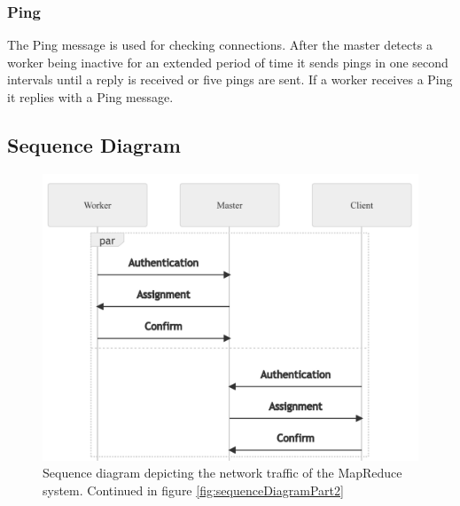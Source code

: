 \documentclass[12pt, letterpaper]{article}
\begin{document}
\subsubsection{Ping}
The Ping message is used for checking connections. After the master detects a worker being inactive for an extended period of time it sends pings in one second intervals until a reply is received or five pings are sent. If a worker receives a Ping it replies with a Ping message.

\subsection{Sequence Diagram}

\begin{figure}[h]
	\centering
	\includegraphics[width=0.6\linewidth]{img/SequenceDiagramPart1}
	\caption{Sequence diagram depicting the network traffic of the MapReduce system. Continued in figure \ref{fig:sequenceDiagramPart2}}
	\label{fig:sequenceDiagramPart1}
\end{figure}
\end{document}
